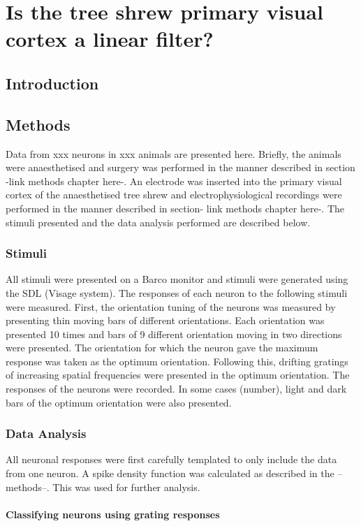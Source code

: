 \chapter{Is the tree shrew primary visual cortex a linear filter?}
	\section{Introduction}
	\section{Methods}
		Data from xxx neurons in xxx animals are presented here. Briefly, the animals were anaesthetised and surgery was performed in the manner described in section -link methods chapter here-. An electrode was inserted into the primary visual cortex of the anaesthetised tree shrew and electrophysiological recordings were performed in the manner described in section- link methods chapter here-. The stimuli presented and the data analysis performed are described below.
		
			\subsection{Stimuli}
				All stimuli were presented on a Barco monitor and stimuli were generated using the SDL (Visage system). The responses of each neuron to the following stimuli were measured. First, the orientation tuning of the neurons was measured by presenting thin moving bars of different orientations. Each orientation was presented 10 times and bars of 9 different orientation moving in two directions were presented. The orientation for which the neuron gave the maximum response was taken as the optimum orientation. Following this, drifting gratings of increasing spatial frequencies were presented in the optimum orientation. The responses of the neurons were recorded. In some cases (number), light and dark bars of the optimum orientation were also presented\cite{Chisum2003a}.
				
			\subsection{Data Analysis}
				All neuronal responses were first carefully templated to only include the data from one neuron. A spike density function was calculated as described in the --methods--. This was used for further analysis.
				
				\subsubsection{Classifying neurons using grating responses}
					
